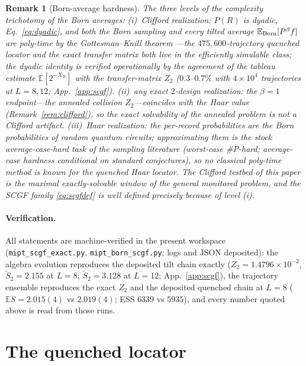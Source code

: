 \documentclass[11pt]{article}
\newtheorem{remark}{Remark}
\newcommand{\E}{\mathbb{E}}
\begin{document}
\begin{remark}[Born-average hardness]\label{rem:hardness}
The three levels of the complexity trichotomy of the Born averages:
(i)~\emph{Clifford realization}: $P(R)$ is dyadic, Eq.~\eqref{eq:dyadic},
and both the Born sampling and every tilted average
$\E_{\rm Born}[P^\beta f]$ are poly-time by the Gottesman--Knill theorem
\citep{Gottesman1998}---the $475{,}600$-trajectory quenched locator and the
exact transfer matrix both live in the efficiently simulable class; the
dyadic identity is verified operationally by the agreement of the tableau
estimate $\E[2^{-X_R}]$ with the transfer-matrix $Z_2$ ($0.3$--$0.7\%$ with
$4\times10^4$ trajectories at $L=8,12$; App.~\ref{app:scgf}).
(ii)~\emph{any exact $2$-design realization}: the $\beta=1$ endpoint---the
annealed collision $Z_2$---coincides with the Haar value
(Remark~\ref{rem:clifford}), so the exact solvability of the annealed
problem is not a Clifford artifact.
(iii)~\emph{Haar realization}: the per-record probabilities are the Born
probabilities of random quantum circuits; approximating them is the stock
average-case-hard task of the sampling literature
\citep{AaronsonArkhipov2013,Bouland2019} (worst-case \#P-hard; average-case
hardness conditional on standard conjectures), so no classical poly-time
method is known for the quenched Haar locator.  The Clifford testbed of
this paper is the maximal exactly-solvable window of the general monitored
problem, and the SCGF family \eqref{eq:scgfdef} is well defined precisely
because of level (i).
\end{remark}

\paragraph{Verification.}
All statements are machine-verified in the present workspace
(\texttt{mipt\_scgf\_exact.py}, \texttt{mipt\_born\_scgf.py}; logs and JSON
deposited): the algebra evolution reproduces the deposited tilt chain
exactly ($Z_2=1.4796\times10^{-2}$, $\tilde S_2=2.155$ at $L=8$;
$\tilde S_2=3.128$ at $L=12$; App.~\ref{app:scgf}), the trajectory ensemble
reproduces the exact $Z_2$ and the deposited quenched chain at $L=8$
($\E S=2.015(4)$ vs $2.019(4)$; ESS $6339$ vs $5935$), and every number
quoted above is read from those runs.

\section{The quenched locator}\label{sec:quenched}
\end{document}
